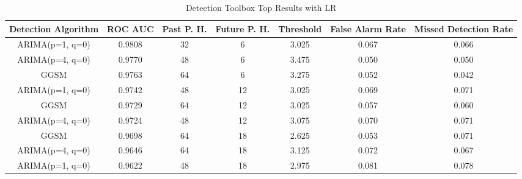 \begin{table*}[h!]
\centering
\caption{Detection Toolbox Top Results with LR}
    \label{table:lrexperimenttwotop3}
    \begin{tabular}{|c|c|c|c|c|c|c|}
        \hline
        Detection Algorithm & ROC AUC & Past P. H. & Future P. H. & Threshold & False Alarm Rate & Missed Detection Rate \\
        \hline
        \hline
        ARIMA(p=1, q=0) & 0.9808 & 32 & 6 & 3.025 &  0.067 & 0.066 \\
        \hline
        ARIMA(p=4, q=0) & 0.9770 & 48 & 6 & 3.475 &  0.050 & 0.050 \\
        \hline
        GGSM & 0.9763 & 64 & 6 & 3.275 &  0.052 & 0.042 \\
        \hline
        ARIMA(p=1, q=0) & 0.9742 & 48 & 12 & 3.025 &  0.069 & 0.071 \\
        \hline
        GGSM & 0.9729 & 64 & 12 & 3.025 &  0.057 & 0.060 \\
        \hline
        ARIMA(p=4, q=0) & 0.9724 & 48 & 12 & 3.075 &  0.070 & 0.071 \\
        \hline
        GGSM & 0.9698 & 64 & 18 & 2.625 &  0.053 & 0.071 \\
        \hline
        ARIMA(p=4, q=0) & 0.9646 & 64 & 18 & 3.125 &  0.072 & 0.067 \\
        \hline
        ARIMA(p=1, q=0) & 0.9622 & 48 & 18 & 2.975 &  0.081 & 0.078 \\
        \hline
    \end{tabular}
\end{table*}

